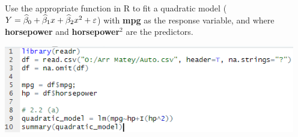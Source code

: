 Use the appropriate function in R to fit a quadratic model ($Y = \widehat{\beta}_0 + \widehat{\beta}_1 x + \widehat{\beta}_2 x^2 + \varepsilon$) with \textbf{mpg} as the response variable, and where \textbf{horsepower} and \textbf{horsepower$^2$} are the predictors.

\soln*
\begin{center}
    \includegraphics[width=5in]{img/a.PNG}
\end{center}
